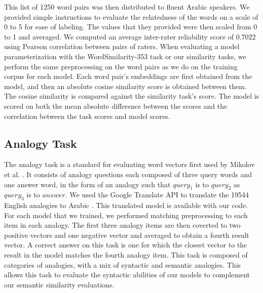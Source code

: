 This list of 1250 word pairs was then distributed to fluent Arabic speakers. We provided simple instructions to evaluate the relatedness of the words on a scale of 0 to 5 for ease of labeling. The values that they provided were then scaled from 0 to 1 and averaged. We computed an average inter-rater reliability score of $0.7022$ using Pearson correlation between pairs of raters.
When evaluating a model parameterization with the WordSimilarity-353 task or our similarity tasks, we perform the same preprocessing on the word pairs as we do on the training corpus for each model. Each word pair's embeddings are first obtained from the model, and then an absolute cosine similarity score is obtained between them. The cosine similarity is compared against the similarity task's score. The model is scored on both the mean absolute difference between the scores and the correlation between the task scores and model scores.


\subsection{Analogy Task}

The analogy task is a standard for evaluating word vectors first used by Mikolov et al. \cite{mikoloveffic:2013}. It consists of analogy questions each composed of three query words and one answer word, in the form of an analogy such that $query_1$ is to $query_2$ as $query_3$ is to $answer$. We used the Google Translate API to translate the 19544 English analogies to Arabic \cite{google:online}. This translated model is available with our code. For each model that we trained, we performed matching preprocessing to each item in each analogy. The first three analogy items are then coverted to two positive vectors and one negative vector and averaged to obtain a fourth result vector. A correct answer on this task is one for which the closest vector to the result in the model matches the fourth analogy item.
This task is composed of categories of analogies, with a mix of syntactic and semantic analogies. This allows this task to evaluate the syntactic abilities of our models to complement our semantic similarity evaluations. 


